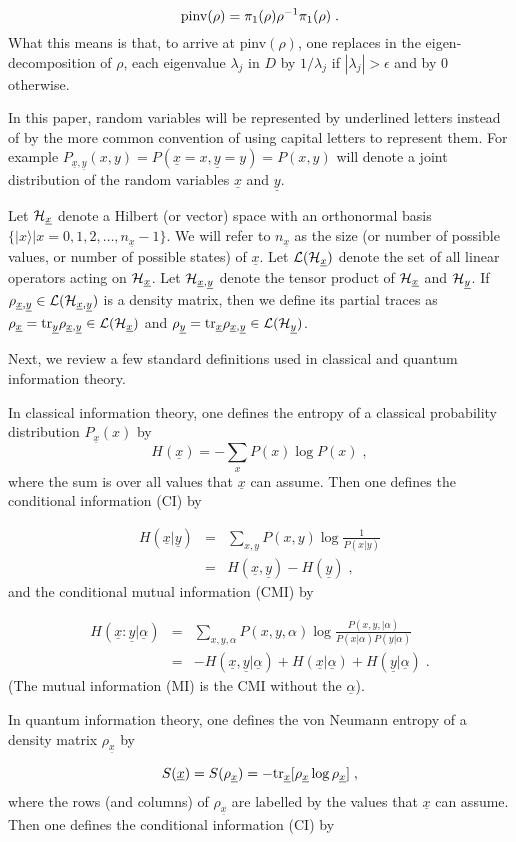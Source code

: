 \documentclass[12pt]{article}%
\newcommand{\ket}[1]{|#1\rangle}
\newcommand{\tr}[0]{{\rm tr }}
\newcommand{\beq}{\begin{equation}}
\newcommand{\eeq}{\end{equation}}
\newcommand{\beqa}{\begin{eqnarray}}
\newcommand{\eeqa}{\end{eqnarray}}
\newcommand{\ul}[1]{\underline{#1}}
\newcommand{\rvx}[0]{{\ul{x}}}
\newcommand{\rvy}[0]{{\ul{y}}}
\newcommand{\calh}[0]{{\cal H}}
\newcommand{\call}[0]{{\cal L}}
\newcommand{\lam}[0]{\lambda}
\newcommand{\rvalp}[0]{{\ul{\alpha}}}
\newcommand{\alp}[0]{{\alpha}}
\begin{document}
\beq
{\rm pinv}(\rho)=
\pi_1(\rho)\rho^{-1} \pi_1(\rho)
\;.
\eeq
What this means is that, to arrive
at pinv$(\rho)$, one replaces
in the eigen-decomposition
of $\rho$, each
eigenvalue $\lam_j$ in $D$ by
$1/\lam_j$ if $|\lam_j|>\epsilon$
and by 0 otherwise.

In this paper, random variables will be
represented by underlined letters
 instead of by the more common
convention of using capital letters to represent them.
For example $P_{\rvx, \rvy}(x, y)=P(\rvx=x,\rvy=y)=P(x,y)$
will denote a joint distribution of the random variables
$\rvx$ and $\rvy$.

Let $\calh_\rvx$ denote a Hilbert (or vector) space
with an orthonormal basis $\{\ket{x}|x=0,1,2,\ldots, n_\rvx-1\}$.
We will refer to $n_\rvx$ as the size (or number of
possible values, or number of possible states) of $\rvx$.
Let $\call(\calh_\rvx)$ denote the set of all linear operators
acting on $\calh_\rvx$.
Let $\calh_{\rvx, \rvy}$ denote the tensor product of $\calh_\rvx$
and $\calh_\rvy$. If $\rho_{\rvx, \rvy}\in \call(\calh_{\rvx, \rvy})$
is a density matrix, then we define its partial traces as
$\rho_\rvx=\tr_\rvy\rho_{\rvx, \rvy}\in\call(\calh_{\rvx})$
and
$\rho_\rvy=\tr_\rvx\rho_{\rvx, \rvy}\in\call(\calh_{\rvy})$.

Next, we review a few standard definitions
used in classical and quantum
information theory.

In
classical information theory, one defines
the entropy of a classical
probability distribution $P_\rvx(x)$ by
\beq
H(\rvx) = -\sum_x P(x)\log P(x)
\;,
\eeq
where the sum is over all values that $\rvx$
can assume.
Then one defines the conditional information (CI) by

\beqa
H(\rvx|\rvy) &=&\sum_{x, y}
P(x, y) \log \frac{ 1}{P(x|y)}
\\
&=&
H(\rvx, \rvy)
-
H(\rvy)
\;,
\eeqa
and the conditional mutual information (CMI) by

\beqa
H(\rvx:\rvy|\rvalp) &=&\sum_{x, y, \alp}
P(x, y, \alp) \log \frac{ P(x, y,| \alp)}{P(x|\alp)P(y|\alp)}
\\
&=&
-H(\rvx, \rvy| \rvalp)
+
H(\rvx| \rvalp)
+
H(\rvy| \rvalp)
\;.
\eeqa
(The mutual information (MI) is the CMI without the $\rvalp$).

In quantum information theory, one defines
the von Neumann entropy of a density matrix $\rho_\rvx$
by

\beq
S(\rvx) = S(\rho_\rvx) =
-\tr_\rvx [\rho_\rvx \log \rho_\rvx]
\;,
\eeq
where the rows (and columns) of $\rho_\rvx$
are labelled by the  values that $\rvx$ can assume.
Then one defines the conditional information (CI) by
\end{document}
